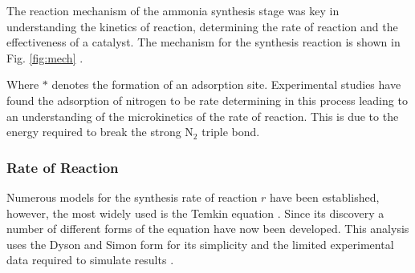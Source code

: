The reaction mechanism of the ammonia synthesis stage was key in understanding the kinetics of reaction, determining the rate of reaction and the effectiveness of a catalyst. The mechanism for the synthesis reaction is shown in Fig. \ref{fig:mech} \cite{Jennings1991}.

Where $*$ denotes the formation of an adsorption site. Experimental studies have found the adsorption of nitrogen to be rate determining in this process leading to an understanding of the microkinetics of the rate of reaction. This is due to the energy required to break the strong N$_2$ triple bond.

%


\subsubsection{Rate of Reaction}

Numerous models \cite{Aparicio2008} for the synthesis rate of reaction $r$ have been established, however, the most widely used is the Temkin equation \cite{Guacci1977}. Since its discovery a number of different forms of the equation have now been developed. This analysis uses the Dyson and Simon form for its simplicity and the limited experimental data required to simulate results \cite{Dyson1968}.

